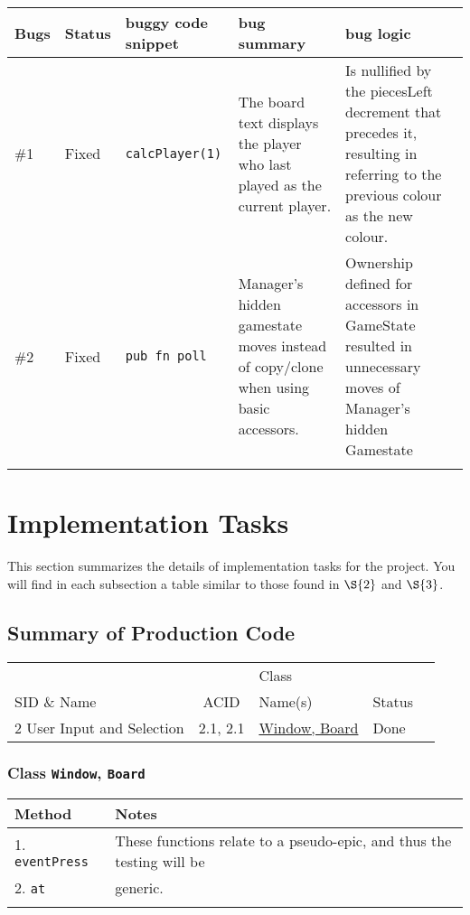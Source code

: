 \documentclass[11pt]{article}
\begin{document}
\begin{center}
\begin{tabular}{lllll}
Bugs & Status & buggy code snippet & bug summary & bug logic\\
\hline
\#1 & Fixed & \texttt{calcPlayer(1)} & The board text displays the player who last played as the current player. & Is nullified by the piecesLeft decrement that precedes it, resulting in referring to the previous colour as the new colour.\\
\#2 & Fixed & \texttt{pub fn poll} & Manager's hidden gamestate moves instead of copy/clone when using basic accessors. & Ownership defined for accessors in GameState resulted in unnecessary moves of Manager's hidden Gamestate\\
 &  &  &  & \\
\hline
\end{tabular}
\end{center}

\section{Implementation Tasks}
\label{sec:orge845e64}
This section summarizes the details of implementation tasks for the project. You will find in each
subsection a table similar to those found in \hyperref[sec:orge86b24b]{\(\S{2}\)} and \hyperref[sec:org238b313]{\(\S{3}\)}.

\subsection{Summary of Production Code}
\label{sec:orgcd92ddc}

\begin{center}
\begin{tabular}{|p{4.5cm}|c|p{3.5cm}|p{4.5cm}|c|}
 &  & Class & \\
SID \& Name & ACID & Name(s) & Status\\
\hline
2 User Input and Selection & 2.1, 2.1 & \hyperref[sec:orga83b779]{Window, Board} & Done\\
\end{tabular}
\end{center}

\subsubsection{Class \texttt{Window}, \texttt{Board}}
\label{sec:orga83b779}
\begin{center}
\begin{tabular}{|l|l|}
Method & Notes\\
\hline
1. \texttt{eventPress} & These functions relate to a pseudo-epic, and thus the testing will be\\
2. \texttt{at} & generic.\\
 & \\
\end{tabular}
\end{center}
\end{document}
